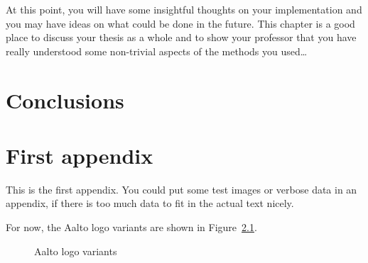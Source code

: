 \documentclass[12pt,a4paper,oneside,pdftex]{report}
\begin{document}
At this point, you will have some insightful thoughts on your implementation
and you may have ideas on what could be done in the future.
This chapter is a good place to discuss your thesis as a whole and to show your
professor that you have really understood some non-trivial aspects of the
methods you used\ldots



% 

\chapter{Conclusions}
\label{chapter:conclusions}




% 



\appendix
% 

\chapter{First appendix}
\label{chapter:first-appendix}

This is the first appendix. You could put some test images or verbose data in an
appendix, if there is too much data to fit in the actual text nicely.

For now, the Aalto logo variants are shown in Figure~\ref{fig:aaltologo}.

\begin{figure}
\begin{center}
\caption{Aalto logo variants}
\label{fig:aaltologo}
\end{center}
\end{figure}


\end{document}
